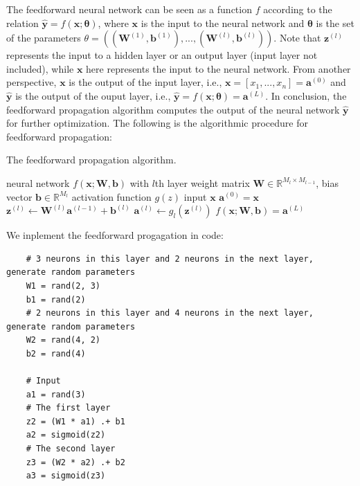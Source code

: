 \documentclass[
	parskip, 			   %
	twoside, 			   %
	DIV=14, 			   %
	BCOR=15.0mm, 		   %
	headsepline, 		   %
	open=right, 		   %
	captions=tableheading, %
	bibliography=totoc,    %
	numbers=noenddot       %
]{scrreprt}
\begin{document}
The feedforward neural network can be seen as a function $f$ according to the relation $\hat{\mathbf{y}} = f(\mathbf{x};\mathbf{\theta})$, where $\mathbf{x}$ is the input to the neural network and $\mathbf{\theta}$ is the set of the parameters $\theta=((\mathbf{W}^{(1)}, \mathbf{b}^{(1)}), ..., (\mathbf{W}^{(l)}, \mathbf{b}^{(l)}))$. Note that $\mathbf{z}^{(l)}$ represents the input to a hidden layer or an output layer (input layer not included), while $\mathbf{x}$ here represents the input to the neural network. From another perspective, $\mathbf{x}$ is the output of the input layer, i.e., $\mathbf{x}=[x_1, ..., x_n]=\mathbf{a}^{(0)}$ and $\hat{\mathbf{y}}$ is the output of the ouput layer, i.e., $\hat{\mathbf{y}}=f(\mathbf{x};\mathbf{\theta})=\mathbf{a}^{(L)}$. In conclusion, the feedforward propagation algorithm computes the output of the neural network $\hat{\mathbf{y}}$ for further optimization. The following is the algorithmic procedure for feedforward propagation:

\clearpage
\begin{algorithm}[h!]
\caption{The feedforward propagation algorithm.}
\label{alg:feedforward_alg}
    \begin{algorithmic}[1]
    \Require neural network $f(\mathbf{x};\mathbf{W},\mathbf{b})$ with $l$th layer
    \Require weight matrix $\mathbf{W} \in \mathbb{R}^{M_{l} \times M_{l-1}}$, bias vector $\mathbf{b} \in \mathbb{R}^{M_{l}}$
    \Require activation function $g(z)$
    \Require input $\mathbf{x}$
    \State $\mathbf{a}^{(0)}=\mathbf{x}$ 
        \State $\mathbf{z}^{(l)} \gets \mathbf{W}^{(l)} \mathbf{a}^{(l-1)} + \mathbf{b}^{(l)}$ 
        \State $\mathbf{a}^{(l)} \gets g_{l}(\mathbf{z}^{(l)})$  
        \State {}
    \EndFor
    \State \Return $f(\mathbf{x};\mathbf{W},\mathbf{b})=\mathbf{a}^{(L)}$ 
    \end{algorithmic}
\end{algorithm}

We inplement the feedforward progagation in code:

\begin{verbatim}
    # 3 neurons in this layer and 2 neurons in the next layer, generate random parameters
    W1 = rand(2, 3)
    b1 = rand(2)
    # 2 neurons in this layer and 4 neurons in the next layer, generate random parameters
    W2 = rand(4, 2)
    b2 = rand(4)
    
    # Input
    a1 = rand(3)
    # The first layer
    z2 = (W1 * a1) .+ b1
    a2 = sigmoid(z2)
    # The second layer
    z3 = (W2 * a2) .+ b2
    a3 = sigmoid(z3)

\end{verbatim}
\end{document}
